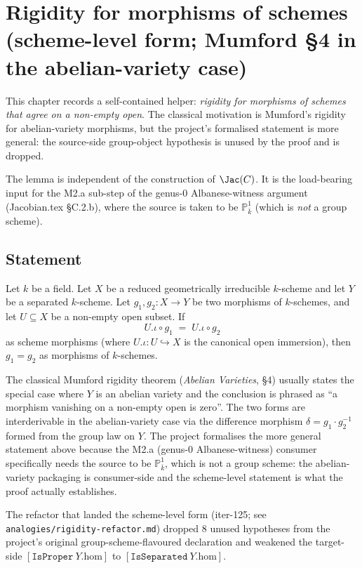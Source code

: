 \chapter{Rigidity for morphisms of schemes (scheme-level form; Mumford \S4 in the abelian-variety case)}
\label{chap:Rigidity}

This chapter records a self-contained helper: \emph{rigidity for morphisms of schemes that agree on a non-empty open}. The classical motivation is Mumford's rigidity for abelian-variety morphisms, but the project's formalised statement is more general: the source-side group-object hypothesis is unused by the proof and is dropped.

The lemma is independent of the construction of \(\Jac(C)\). It is the load-bearing input for the M2.a sub-step of the genus-0 Albanese-witness argument (Jacobian.tex \S C.2.b), where the source is taken to be \(\mathbb P^1_{\bar k}\) (which is \emph{not} a group scheme).

\section{Statement}

\begin{theorem}
  \label{thm:GrpObj_eq_of_eqOnOpen}
  Let \(k\) be a field. Let \(X\) be a reduced geometrically irreducible \(k\)-scheme and let \(Y\) be a separated \(k\)-scheme. Let \(g_1, g_2 \colon X \to Y\) be two morphisms of \(k\)-schemes, and let \(U \subseteq X\) be a non-empty open subset. If
  \[
    U.\iota \circ g_1 \;=\; U.\iota \circ g_2
  \]
  as scheme morphisms (where \(U.\iota \colon U \hookrightarrow X\) is the canonical open immersion), then \(g_1 = g_2\) as morphisms of \(k\)-schemes.
\end{theorem}

\begin{remark}
  The classical Mumford rigidity theorem (\emph{Abelian Varieties}, \S4) usually states the special case where \(Y\) is an abelian variety and the conclusion is phrased as ``a morphism vanishing on a non-empty open is zero''. The two forms are interderivable in the abelian-variety case via the difference morphism \(\delta = g_1 \cdot g_2^{-1}\) formed from the group law on \(Y\). The project formalises the more general statement above because the M2.a (genus-0 Albanese-witness) consumer specifically needs the source to be \(\mathbb P^1_{\bar k}\), which is not a group scheme: the abelian-variety packaging is consumer-side and the scheme-level statement is what the proof actually establishes.

  The refactor that landed the scheme-level form (iter-125; see \texttt{analogies/rigidity-refactor.md}) dropped 8 unused hypotheses from the project's original group-scheme-flavoured declaration and weakened the target-side \([\mathtt{IsProper}\ Y.\mathrm{hom}]\) to \([\mathtt{IsSeparated}\ Y.\mathrm{hom}]\).
\end{remark}

